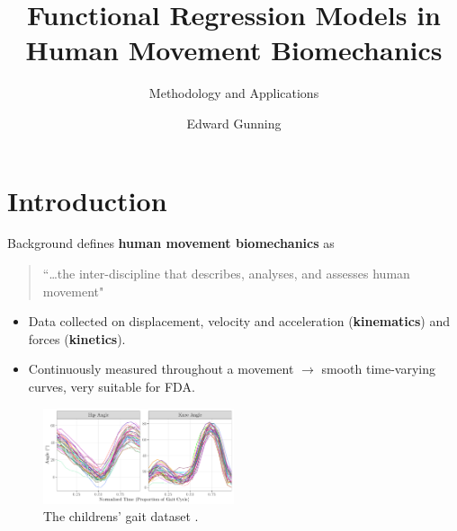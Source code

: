 \documentclass[aspectratio=128,xcolor=dvipsnames, notes]{beamer}
\title[short title]{Functional Regression Models in Human Movement Biomechanics} %
\subtitle{Methodology and Applications}
\author[Edward Gunning] {Edward Gunning}
\date{
    \vskip1em
    JHU Biostatistics Wearable and Implantable Technology Group \\
    \vskip1em
    September $13^${th} $2024$
} %
\newcommand{\1}{\mathbf{1}}
\begin{document}
\begin{frame}
    \titlepage
\end{frame}

\section{Introduction}

\begin{frame}{Background}
\textcite{winter_biomechanics_1979} defines \textbf{human movement biomechanics} as
    \begin{quote}
        ``\dots the inter-discipline that describes, analyses, and assesses human movement" 
    \end{quote}

\begin{itemize}
    \pause \item Data collected on displacement, velocity and acceleration (\textbf{kinematics}) and forces (\textbf{kinetics}).
    \pause \item Continuously measured throughout a movement $\rightarrow$ smooth time-varying curves, very suitable for FDA.
\end{itemize}
\vfill
\pause \begin{figure}
    \centering
    \includegraphics[width=0.5\textwidth, page = 1]{figures/thesis-chapt-1-2.pdf}
    \caption{The childrens' gait dataset \parencite{rice_estimating_1991}.}
    \label{fig:enter-label}
\end{figure}
\end{frame}
\end{document}
